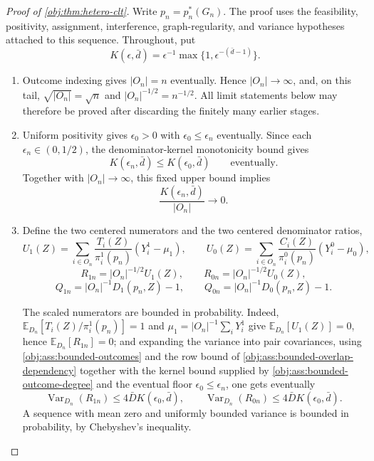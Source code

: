 \begin{proof}[Proof of \cref{obj:thm:hetero-clt}]
Write \(p_n=p_n^*(G_n)\).  The proof uses the feasibility, positivity, assignment, interference, graph-regularity, and variance hypotheses attached to this sequence.  Throughout, put
\[
K(\epsilon,\bar d)=\epsilon^{-1}\max\{1,\epsilon^{-(\bar d-1)}\}.
\]

\begin{enumerate}
\item Outcome indexing gives \(|O_n|=n\) eventually.  Hence \(|O_n|\to\infty\), and, on this tail, \(\sqrt{|O_n|}=\sqrt n\) and \(|O_n|^{-1/2}=n^{-1/2}\).  All limit statements below may therefore be proved after discarding the finitely many earlier stages.

\item Uniform positivity gives \(\epsilon_0>0\) with \(\epsilon_0\le\epsilon_n\) eventually.  Since each \(\epsilon_n\in(0,1/2)\), the denominator-kernel monotonicity bound gives
\[
K(\epsilon_n,\bar d)\le K(\epsilon_0,\bar d)
\qquad\text{eventually.}
\]
Together with \(|O_n|\to\infty\), this fixed upper bound implies
\[
\frac{K(\epsilon_n,\bar d)}{|O_n|}\longrightarrow0.
\]

\item Define the two centered numerators and the two centered denominator ratios,
\[
U_1(Z)=\sum_{i\in O_n}\frac{T_i(Z)}{\pi_i^1(p_n)}\left(Y_i^1-\mu_1\right),
\qquad
U_0(Z)=\sum_{i\in O_n}\frac{C_i(Z)}{\pi_i^0(p_n)}\left(Y_i^0-\mu_0\right),
\]
\[
R_{1n}=|O_n|^{-1/2}U_1(Z),\qquad
R_{0n}=|O_n|^{-1/2}U_0(Z),
\]
\[
Q_{1n}=|O_n|^{-1}D_1(p_n,Z)-1,\qquad
Q_{0n}=|O_n|^{-1}D_0(p_n,Z)-1.
\]

The scaled numerators are bounded in probability.  Indeed, \(\mathbb E_{D_n}[T_i(Z)/\pi_i^1(p_n)]=1\) and \(\mu_1=|O_n|^{-1}\sum_iY_i^1\) give \(\mathbb E_{D_n}[U_1(Z)]=0\), hence \(\mathbb E_{D_n}[R_{1n}]=0\); and expanding the variance into pair covariances, using \cref{obj:ass:bounded-outcomes} and the row bound of \cref{obj:ass:bounded-overlap-dependency} together with the kernel bound supplied by \cref{obj:ass:bounded-outcome-degree} and the eventual floor \(\epsilon_0\le\epsilon_n\), one gets eventually
\[
\operatorname{Var}_{D_n}(R_{1n})\le 4\bar D K(\epsilon_0,\bar d),
\qquad
\operatorname{Var}_{D_n}(R_{0n})\le 4\bar D K(\epsilon_0,\bar d).
\]
A sequence with mean zero and uniformly bounded variance is bounded in probability, by Chebyshev's inequality.


\end{enumerate}
\end{proof}
